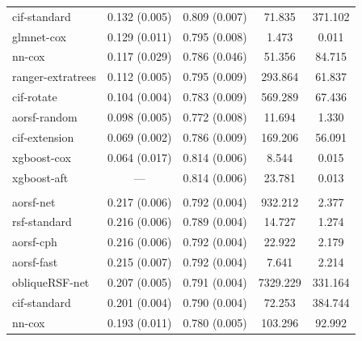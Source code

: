 \documentclass{article}\usepackage[]{graphicx}\usepackage[]{xcolor}
\newenvironment{knitrout}{}{} %
\begin{document}
\begin{knitrout}
\begin{longtable}[t]{lcccc}
\hspace{1em}cif-standard & 0.132 (0.005) & 0.809 (0.007) & 71.835 & 371.102\\
\hspace{1em}glmnet-cox & 0.129 (0.011) & 0.795 (0.008) & 1.473 & 0.011\\
\hspace{1em}nn-cox & 0.117 (0.029) & 0.786 (0.046) & 51.356 & 84.715\\
\hspace{1em}ranger-extratrees & 0.112 (0.005) & 0.795 (0.009) & 293.864 & 61.837\\
\hspace{1em}cif-rotate & 0.104 (0.004) & 0.783 (0.009) & 569.289 & 67.436\\
\hspace{1em}aorsf-random & 0.098 (0.005) & 0.772 (0.008) & 11.694 & 1.330\\
\hspace{1em}cif-extension & 0.069 (0.002) & 0.786 (0.009) & 169.206 & 56.091\\
\hspace{1em}xgboost-cox & 0.064 (0.017) & 0.814 (0.006) & 8.544 & 0.015\\
\hspace{1em}xgboost-aft & --- & 0.814 (0.006) & 23.781 & 0.013\\
\addlinespace[0.3em]
\multicolumn{5}{l}{\textit{\textbf{ARIC; death, n = 13623, p = 41}}}\\
\hline
\hspace{1em}aorsf-net & 0.217 (0.006) & 0.792 (0.004) & 932.212 & 2.377\\
\hspace{1em}rsf-standard & 0.216 (0.006) & 0.789 (0.004) & 14.727 & 1.274\\
\hspace{1em}aorsf-cph & 0.216 (0.006) & 0.792 (0.004) & 22.922 & 2.179\\
\hspace{1em}aorsf-fast & 0.215 (0.007) & 0.792 (0.004) & 7.641 & 2.214\\
\hspace{1em}obliqueRSF-net & 0.207 (0.005) & 0.791 (0.004) & 7329.229 & 331.164\\
\hspace{1em}cif-standard & 0.201 (0.004) & 0.790 (0.004) & 72.253 & 384.744\\
\hspace{1em}nn-cox & 0.193 (0.011) & 0.780 (0.005) & 103.296 & 92.992\\

\end{longtable}
\end{knitrout}
\end{document}
